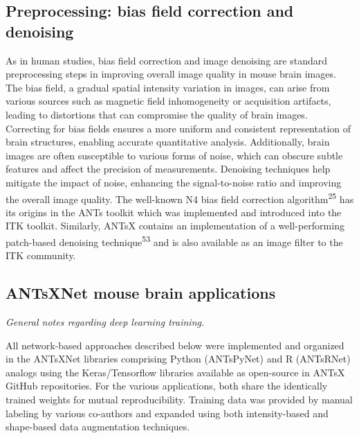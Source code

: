 \documentclass[
  12pt,
]{article}
\begin{document}
\hypertarget{preprocessing-bias-field-correction-and-denoising}{%
\subsection*{Preprocessing: bias field correction and
denoising}\label{preprocessing-bias-field-correction-and-denoising}}

As in human studies, bias field correction and image denoising are
standard preprocessing steps in improving overall image quality in mouse
brain images. The bias field, a gradual spatial intensity variation in
images, can arise from various sources such as magnetic field
inhomogeneity or acquisition artifacts, leading to distortions that can
compromise the quality of brain images. Correcting for bias fields
ensures a more uniform and consistent representation of brain
structures, enabling accurate quantitative analysis. Additionally, brain
images are often susceptible to various forms of noise, which can
obscure subtle features and affect the precision of measurements.
Denoising techniques help mitigate the impact of noise, enhancing the
signal-to-noise ratio and improving the overall image quality. The
well-known N4 bias field correction algorithm\textsuperscript{25} has
its origins in the ANTs toolkit which was implemented and introduced
into the ITK toolkit. Similarly, ANTsX contains an implementation of a
well-performing patch-based denoising technique\textsuperscript{53} and
is also available as an image filter to the ITK community.

\hypertarget{antsxnet-mouse-brain-applications}{%
\subsection*{ANTsXNet mouse brain
applications}\label{antsxnet-mouse-brain-applications}}

\emph{General notes regarding deep learning training.}

All network-based approaches described below were implemented and
organized in the ANTsXNet libraries comprising Python (ANTsPyNet) and R
(ANTsRNet) analogs using the Keras/Tensorflow libraries available as
open-source in ANTsX GitHub repositories. For the various applications,
both share the identically trained weights for mutual reproducibility.
Training data was provided by manual labeling by various co-authors and
expanded using both intensity-based and shape-based data augmentation
techniques.
\end{document}
